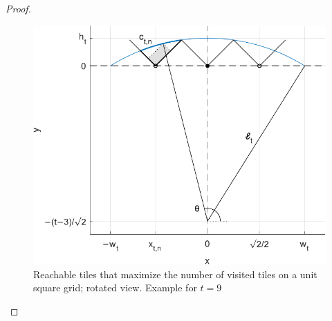 \documentclass[12pt, a4paper]{article}
\newcommand{\tiles}{t} %
\begin{document}
\begin{proof}
\begin{figure}%
\centering
\includegraphics[width=.73\textwidth]{probmax_asint_turned}%
\caption{Reachable tiles that maximize the number of visited tiles on a unit square grid; rotated view. Example for $\tiles=9$}
\label{fig: probmax_asint_turned}%
\end{figure}%


\end{proof}
\end{document}
